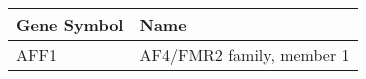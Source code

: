 \begin{tabular}{ll}
\toprule
Gene Symbol &                      Name \\
\midrule
       AFF1 & AF4/FMR2 family, member 1 \\
\bottomrule
\end{tabular}
